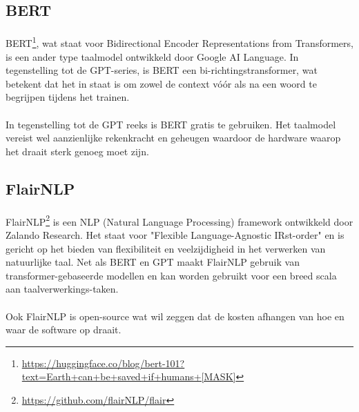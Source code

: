 \subsection{BERT}%

\paragraph{}
BERT\footnote{\href{https://huggingface.co/blog/bert-101?text=Earth+can+be+saved+if+humans+[MASK]}{https://huggingface.co/blog/bert-101?text=Earth+can+be+saved+if+humans+[MASK]}}, wat staat voor Bidirectional Encoder Representations from Transformers, is een ander type taalmodel ontwikkeld door Google AI Language. In tegenstelling tot de GPT-series, is BERT een bi-richtingstransformer, wat betekent dat het in staat is om zowel de context vóór als na een woord te begrijpen tijdens het trainen.

\paragraph{}
In tegenstelling tot de GPT reeks is BERT gratis te gebruiken. Het taalmodel vereist wel aanzienlijke rekenkracht en geheugen waardoor de hardware waarop het draait sterk genoeg moet zijn.

\subsection{FlairNLP}%

\paragraph{}
FlairNLP\footnote{\href{https://github.com/flairNLP/flair}{https://github.com/flairNLP/flair}} is een NLP (Natural Language Processing) framework ontwikkeld door Zalando Research. Het staat voor "Flexible Language-Agnostic IRst-order" en is gericht op het bieden van flexibiliteit en veelzijdigheid in het verwerken van natuurlijke taal. Net als BERT en GPT maakt FlairNLP gebruik van transformer-gebaseerde modellen en kan worden gebruikt voor een breed scala aan taalverwerkings-taken.

\paragraph{}
Ook FlairNLP is open-source wat wil zeggen dat de kosten afhangen van hoe en waar de software op draait.

